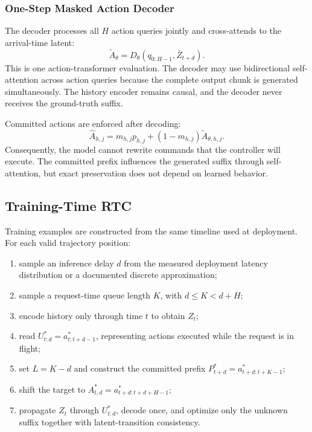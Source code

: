 \subsubsection{One-Step Masked Action Decoder}

The decoder processes all \(H\) action queries jointly and cross-attends to the
arrival-time latent:
\begin{equation}
    \widetilde A_\theta
    =
    D_\theta
    \left(
        q_{0:H-1},
        \bar Z_{t+d}
    \right).
    \label{eq:one_step_decoder}
\end{equation}
This is one action-transformer evaluation.  The decoder may use bidirectional
self-attention across action queries because the complete output chunk is
generated simultaneously.  The history encoder remains causal, and the
decoder never receives the ground-truth suffix.

Committed actions are enforced after decoding:
\begin{equation}
    \widehat A_{h,j}
    =
    m_{h,j}p_{h,j}
    +(1-m_{h,j})\widetilde A_{\theta,h,j}.
    \label{eq:hard_prefix_copy}
\end{equation}
Consequently, the model cannot rewrite commands that the controller will
execute.  The committed prefix influences the generated suffix through
self-attention, but exact preservation does not depend on learned behavior.

\subsection{Training-Time RTC}
\label{sec:training_rtc}

Training examples are constructed from the same timeline used at deployment.
For each valid trajectory position:
\begin{enumerate}
    \item sample an inference delay \(d\) from the measured deployment latency
          distribution or a documented discrete approximation;
    \item sample a request-time queue length \(K\), with \(d\leq K<d+H\);
    \item encode history only through time \(t\) to obtain \(Z_t\);
    \item read \(U_{t:d}^{*}=a_{t:t+d-1}^{*}\), representing actions executed
          while the request is in flight;
    \item set \(L=K-d\) and construct the committed prefix
          \(P_{t+d}^{*}=a_{t+d:t+K-1}^{*}\);
    \item shift the target to \(A_{t,d}^{*}=a_{t+d:t+d+H-1}^{*}\);
    \item propagate \(Z_t\) through \(U_{t:d}^{*}\), decode once, and optimize
          only the unknown suffix together with latent-transition consistency.
\end{enumerate}

